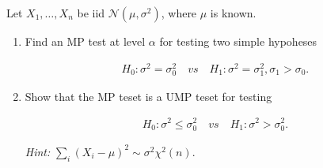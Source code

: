 
\begin{exercise}

Let $X_1, \dots, X_n$ be iid $\mathcal N(\mu, \sigma^2)$, where $\mu$ is known.

\begin{enumerate}[label = (\alph*)]

    \item Find an MP test at level $\alpha$ for testing two simple hypoheses
    
    \begin{align*}
        H_0: \sigma^2 = \sigma_0^2
        \quad
        \textit{vs}
        \quad
        H_1: \sigma^2 = \sigma_1^2, \sigma_1 > \sigma_0.
    \end{align*}

    \item Show that the MP teset is a UMP teset for testing
    
    \begin{align*}
        H_0: \sigma^2 \leq \sigma_0^2
        \quad
        \textit{vs}
        \quad
        H_1: \sigma^2 > \sigma_0^2.
    \end{align*}

    \textit{Hint:}
    $\sum_i (X_i - \mu)^2 \sim \sigma^2 \chi^2(n)$.

\end{enumerate}

\end{exercise}


\begin{solution}

\phantom{}

\end{solution}

